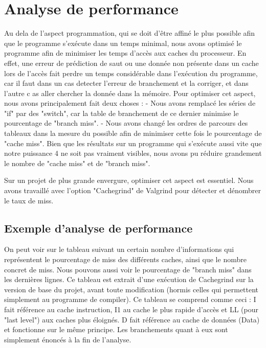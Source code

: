 \documentclass{report}
\begin{document}
\newpage
\chapter{Analyse de performance}
Au dela de l'aspect programmation, qui se doit d'être affiné le plus possible afin que le programme s’exécute dans un temps minimal, nous avons optimisé le programme afin de minimiser les temps d'accès aux caches du processeur.
En effet, une erreur de prédiction de saut ou une donnée non présente dans un cache lors de l’accès fait perdre un temps considérable dans l'exécution du programme, car il faut dans un cas detecter l'erreur de branchement et la corriger, et dans l'autre c
as aller chercher la donnée dans la mémoire.
Pour optimiser cet aspect, nous avons principalement fait deux choses : 
\newline
- Nous avons remplacé les séries de "if" par des "switch", car la table de branchement de ce dernier minimise le pourcentage de "branch miss". 
\newline
- Nous avons changé les ordres de parcours des tableaux dans la mesure du possible afin de minimiser cette fois le pourcentage de "cache miss".
\newline
Bien que les résultats sur un programme qui s’exécute aussi vite que notre puissance 4 ne soit pas vraiment visibles, nous avons pu réduire grandement le nombre de "cache miss" et de "branch miss".

Sur un projet de plus grande envergure, optimiser cet aspect est essentiel.
Nous avons travaillé avec l'option "Cachegrind" de Valgrind pour détecter et dénombrer le taux de miss.

\section{Exemple d'analyse de performance}

On peut voir sur le tableau suivant un certain nombre d'informations qui représentent le pourcentage de miss des différents caches, ainsi que le nombre concret de miss. 
Nous pouvons aussi voir le pourcentage de "branch miss" dans les dernières lignes. 
Ce tableau est extrait d'une exécution de Cachegrind sur la version de base du projet, avant toute modification (hormis celles qui permettent simplement au programme de compiler).
Ce tableau se comprend comme ceci :
\newline
I fait référence au cache instruction, I1 au cache le plus rapide d'accès et LL (pour "last level") aux caches plus éloignés.
\newline
D fait référence au cache de données (Data) et fonctionne sur le même principe.
Les branchements quant à eux sont simplement énoncés à la fin de l'analyse.
\end{document}
